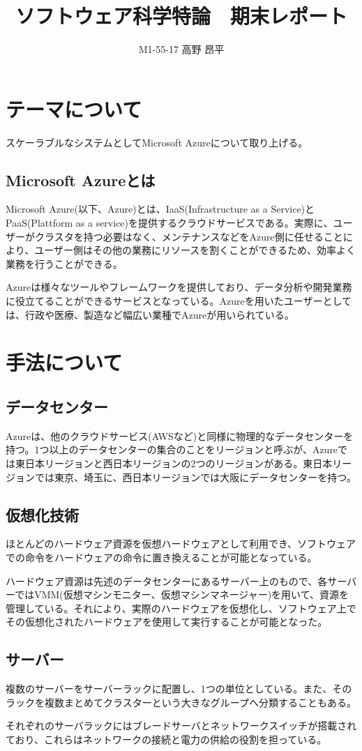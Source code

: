 \documentclass{jsarticle}
\title{ソフトウェア科学特論　期末レポート}
\author{M1-55-17 高野 昂平}
\date{}
\begin{document}
\maketitle

\section{テーマについて}
スケーラブルなシステムとしてMicrosoft Azureについて取り上げる。
\subsection{Microsoft Azureとは}
Microsoft Azure(以下、Azure)とは、IaaS(Infrastructure as a Service)とPaaS(Plattform as a service)を提供するクラウドサービスである。実際に、ユーザーがクラスタを持つ必要はなく、メンテナンスなどをAzure側に任せることにより、ユーザー側はその他の業務にリソースを割くことができるため、効率よく業務を行うことができる。
\par Azureは様々なツールやフレームワークを提供しており、データ分析や開発業務に役立てることができるサービスとなっている。Azureを用いたユーザーとしては、行政や医療、製造など幅広い業種でAzureが用いられている。
\section{手法について}
\subsection{データセンター}
Azureは、他のクラウドサービス(AWSなど)と同様に物理的なデータセンターを持つ。1つ以上のデータセンターの集合のことをリージョンと呼ぶが、Azureでは東日本リージョンと西日本リージョンの2つのリージョンがある。東日本リージョンでは東京、埼玉に、西日本リージョンでは大阪にデータセンターを持つ。
\subsection{仮想化技術}
ほとんどのハードウェア資源を仮想ハードウェアとして利用でき、ソフトウェアでの命令をハードウェアの命令に置き換えることが可能となっている。
\par ハードウェア資源は先述のデータセンターにあるサーバー上のもので、各サーバーではVMM(仮想マシンモニター、仮想マシンマネージャー)を用いて、資源を管理している。それにより、実際のハードウェアを仮想化し、ソフトウェア上でその仮想化されたハードウェアを使用して実行することが可能となった。
\subsection{サーバー}
複数のサーバーをサーバーラックに配置し、1つの単位としている。また、そのラックを複数まとめてクラスターという大きなグループへ分類することもある。
\par それぞれのサーバラックにはブレードサーバとネットワークスイッチが搭載されており、これらはネットワークの接続と電力の供給の役割を担っている。
\end{document}
